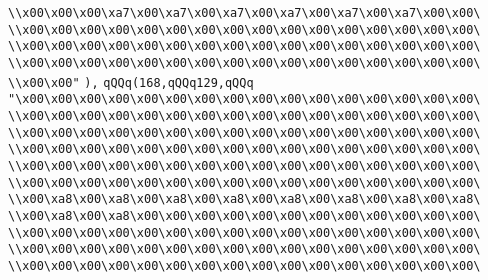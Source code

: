 \verb|\\x00\x00\x00\xa7\x00\xa7\x00\xa7\x00\xa7\x00\xa7\x00\xa7\x00\x00\|\newline
\verb|\\x00\x00\x00\x00\x00\x00\x00\x00\x00\x00\x00\x00\x00\x00\x00\x00\|\newline
\verb|\\x00\x00\x00\x00\x00\x00\x00\x00\x00\x00\x00\x00\x00\x00\x00\x00\|\newline
\verb|\\x00\x00\x00\x00\x00\x00\x00\x00\x00\x00\x00\x00\x00\x00\x00\x00\|\newline
\verb|\\x00\x00"|\newline
\verb|),|\newline
\verb|qQQq(168,qQQq129,qQQq|\newline
\verb|"\x00\x00\x00\x00\x00\x00\x00\x00\x00\x00\x00\x00\x00\x00\x00\x00\|\newline
\verb|\\x00\x00\x00\x00\x00\x00\x00\x00\x00\x00\x00\x00\x00\x00\x00\x00\|\newline
\verb|\\x00\x00\x00\x00\x00\x00\x00\x00\x00\x00\x00\x00\x00\x00\x00\x00\|\newline
\verb|\\x00\x00\x00\x00\x00\x00\x00\x00\x00\x00\x00\x00\x00\x00\x00\x00\|\newline
\verb|\\x00\x00\x00\x00\x00\x00\x00\x00\x00\x00\x00\x00\x00\x00\x00\x00\|\newline
\verb|\\x00\x00\x00\x00\x00\x00\x00\x00\x00\x00\x00\x00\x00\x00\x00\x00\|\newline
\verb|\\x00\xa8\x00\xa8\x00\xa8\x00\xa8\x00\xa8\x00\xa8\x00\xa8\x00\xa8\|\newline
\verb|\\x00\xa8\x00\xa8\x00\x00\x00\x00\x00\x00\x00\x00\x00\x00\x00\x00\|\newline
\verb|\\x00\x00\x00\x00\x00\x00\x00\x00\x00\x00\x00\x00\x00\x00\x00\x00\|\newline
\verb|\\x00\x00\x00\x00\x00\x00\x00\x00\x00\x00\x00\x00\x00\x00\x00\x00\|\newline
\verb|\\x00\x00\x00\x00\x00\x00\x00\x00\x00\x00\x00\x00\x00\x00\x00\x00\|\newline
